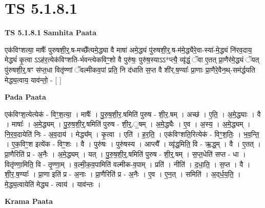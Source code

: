 \documentclass[17pt]{extarticle}
\begin{document}
\section{ TS 5.1.8.1 }

\textbf{TS 5.1.8.1 } \newline
\textbf{Samhita Paata} \newline

एक॑विꣳशत्या॒ माषैः᳚ पुरुषशी॒र्॒.ष-मच्छै᳚त्यमे॒द्ध्या वै माषा॑ अमे॒द्ध्यं पु॑रुषशी॒र्॒.ष-म॑मे॒द्ध्यैरे॒वा-स्या॑-मे॒द्ध्यं नि॑रव॒दाय॒ मेद्ध्यं॑ कृ॒त्वा ऽऽह॑र॒त्येक॑विꣳशति-र्भवन्त्येकविꣳ॒॒शो वै पुरु॑षः॒ पुरु॑ष॒स्याऽऽ*प्त्यै॒ व्यृ॑द्धं॒ ॅवा ए॒तत् प्रा॒णैर॑मे॒द्ध्यं ॅयत् पु॑रुषशी॒र्॒.षꣳ स॑प्त॒धा वितृ॑ण्णां ॅवल्मीकव॒पां प्रति॒ नि द॑धाति स॒प्त वै शी॑र्.ष॒ण्याः᳚ प्रा॒णाः प्रा॒णैरे॒वैन॒थ्-सम॑र्द्धयति मेद्ध्य॒त्वाय॒ याव॑न्तो॒ - [  ] \newline

\textbf{Pada Paata} \newline

एक॑विꣳश॒त्येत्येक॑ - विꣳ॒॒श॒त्या॒ । माषैः᳚ । पु॒रु॒ष॒शी॒र॒.षमिति॑ पुरुष - शी॒र॒.षम् । अच्छ॑ । ए॒ति॒ । अ॒मे॒द्ध्याः । वै । माषाः᳚ । अ॒मे॒द्ध्यम् । पु॒रु॒ष॒शी॒र्॒.षमिति॑ पुरुष - शी॒र्॒.॒षम् । अ॒मे॒द्ध्यैः । ए॒व । अ॒स्य॒ । अ॒मे॒द्ध्यम् । नि॒र॒व॒दायेति॑ निः - अ॒व॒दाय॑ । मेद्ध्य᳚म् । कृ॒त्वा । एति॑ । ह॒र॒ति॒ । एक॑विꣳशति॒रित्येक॑ - विꣳ॒॒श॒तिः॒ । भ॒व॒न्ति॒ । ए॒क॒विꣳ॒॒श इत्ये॑क - विꣳ॒॒शः । वै । पुरु॑षः । पुरु॑षस्य । आप्त्यै᳚ । व्यृ॑द्ध॒मिति॒ वि - ऋ॒द्ध॒म् । वै । ए॒तत् । प्रा॒णैरिति॑ प्र - अ॒नैः । अ॒मे॒द्ध्यम् । यत् । पु॒रु॒ष॒शी॒र्॒.षमिति॑ पुरुष - शी॒र्॒.षम् । स॒प्त॒धेति॑ सप्त - धा । वितृ॑ण्णा॒मिति॒ वि - तृ॒ण्णा॒म् । व॒ल्मी॒क॒व॒पामिति॑ वल्मीक-व॒पाम् । प्रति॑ । नीति॑ । द॒धा॒ति॒ । स॒प्त । वै । शी॒र॒.ष॒ण्याः᳚ । प्रा॒णा इति॑ प्र - अ॒नाः । प्रा॒णैरिति॑ प्र - अ॒नैः । ए॒व । ए॒न॒त् । समिति॑ । अ॒द्‌र्ध॒य॒ति॒ । मे॒द्ध्य॒त्वायेति॑ मेद्ध्य - त्वाय॑ । याव॑न्तः ।  \newline


\textbf{Krama Paata} \newline
\end{document}
